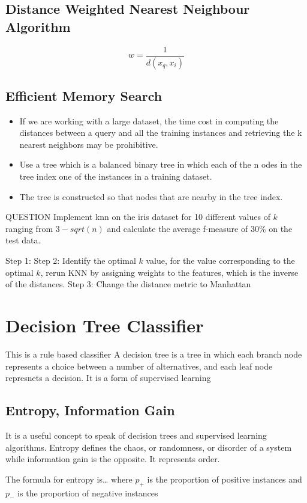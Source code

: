 \documentclass[11pt]{article}
\begin{document}
\subsection{Distance Weighted Nearest Neighbour Algorithm}
\label{sec:orgd5b7add}
$$w = \frac{1}{d(x_{q},x_{i})}$$
\subsection{Efficient Memory Search}
\label{sec:org4cab829}
\begin{itemize}
\item If we are working with a large dataset, the time cost in computing the distances between a query and all the training instances and retrieving the k nearest neighbors may be prohibitive.
\item Use a tree which is a balanced binary tree in which each of the n odes in the tree index one of the instances in a training dataset.
\item The tree is constructed so that nodes that are nearby in the tree index.
\end{itemize}


QUESTION Implement knn on the iris dataset for 10 different values of \(k\) ranging from \(3 - sqrt(n)\) and calculate the average f-measure of 30\% on the test data.

Step 1:
Step 2: Identify the optimal \(k\) value, for the value corresponding to the optimal \(k\), rerun KNN by assigning weights to the features, which is the inverse of the distances.
Step 3: Change the distance metric to Manhattan
\section{Decision Tree Classifier}
\label{sec:org55d3754}
This is a rule based classifier
A decision tree is a tree in which each branch node represents a choice between a number of alternatives, and each leaf node represnets a decision. It is a form of supervised learning
\subsection{Entropy, Information Gain}
\label{sec:org6977077}
It is a useful concept to speak of decision trees and supervised learning algorithms. Entropy defines the chaos, or randomness, or disorder of a system while information gain is the opposite. It represents order.

The formula for entropy is\ldots{} where \(p_+\) is the proportion of  positive instances and \(p_-\) is the proportion of negative instances
\end{document}
